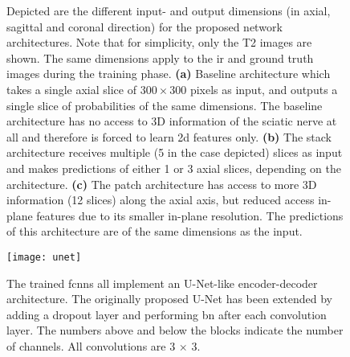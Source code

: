 \begin{figure}[htbp]
	\centering
	\hfill
    \hfill
	\caption[Inputs and Outputs of the Architectures]{Depicted are the different input- and output dimensions (in axial, sagittal and coronal direction) for the proposed network architectures. Note that for simplicity, only the T2 images are shown. The same dimensions apply to the \gls{ir} and ground truth images during the training phase. \textbf{(a)} Baseline architecture which takes a single axial slice of $300 \times 300$ pixels as input, and outputs a single slice of probabilities of the same dimensions. The baseline architecture has no access to 3D information of the sciatic nerve at all and therefore is forced to learn \gls{2d} features only. \textbf{(b)} The stack architecture receives multiple (5 in the case depicted) slices as input and makes predictions of either 1 or 3 axial slices, depending on the architecture. \textbf{(c)} The patch architecture has access to more 3D information (12 slices) along the axial axis, but reduced access in-plane features due to its smaller in-plane resolution. The predictions of this architecture are of the same dimensions as the input.}
	\label{fig:inout}  
\end{figure}

\begin{figure}[htbp]	
	\texttt{[image: unet]}
    \caption[Network Architecture]{The trained \gls{fcnn}s all implement an U-Net-like encoder-decoder architecture. The originally proposed U-Net has been extended by adding a dropout layer and performing \gls{bn} after each convolution layer. The numbers above and below the blocks indicate the number of channels. All convolutions are 3 $\times$ 3.}
    \label{fig:unet}
\end{figure}

